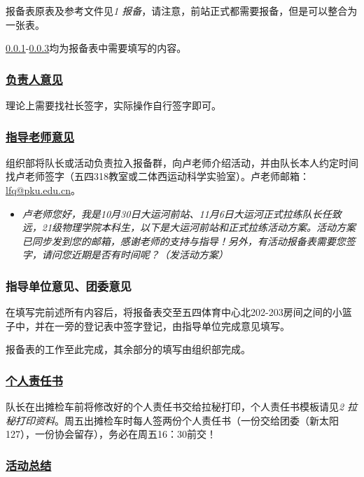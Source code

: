\documentclass[UTF8]{ctexart}
\begin{document}
报备表原表及参考文件见{\color{blue}\textit{1 报备}}，请注意，前站正式都需要报备，但是可以整合为一张表。

\ref{起始}-\ref{结束}均为报备表中需要填写的内容。

\subsubsection[负责人意见]{\underline{负责人意见}}\label{起始}

理论上需要找社长签字，实际操作自行签字即可。

\subsubsection[指导老师意见]{\underline{指导老师意见}}

组织部将队长或活动负责拉入报备群，向卢老师介绍活动，并由队长本人约定时间找卢老师签字（五四318教室或二体西运动科学实验室）。卢老师邮箱：\href{mailto:lfq@pku.edu.cn}{lfq@pku.edu.cn}。

\begin{itemize}[nosep]
    \item[] \textit{卢老师您好，我是10月30日大运河前站、11月6日大运河正式拉练队长任致远，21级物理学院本科生，以下是大运河前站和正式拉练活动方案。活动方案已同步发到您的邮箱，感谢老师的支持与指导！另外，有活动报备表需要您签字，请问您近期是否有时间呢？（发活动方案）}
\end{itemize}

\subsubsection{指导单位意见、团委意见}\label{结束}

在填写完前述所有内容后，将报备表交至五四体育中心北202-203房间之间的小篮子中，并在一旁的登记表中签字登记，由指导单位完成意见填写。

报备表的工作至此完成，其余部分的填写由组织部完成。

\subsubsection[个人责任书]{\underline{个人责任书}}

队长在出摊检车前将修改好的个人责任书交给拉秘打印，个人责任书模板请见{\color{blue}\textit{2 拉秘打印资料}}。周五出摊检车时每人签两份个人责任书（一份交给团委（新太阳127），一份协会留存），务必在周五16：30前交！

\subsubsection[活动总结]{\underline{活动总结}}
\end{document}
